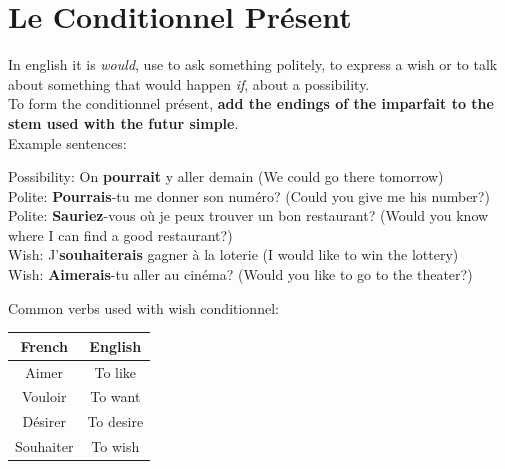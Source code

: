 \documentclass{book}
\begin{document}
\section{Le Conditionnel Présent}
In english it is \textit{would}, use to ask something politely, to express a wish or to talk about something that would happen \textit{if}, about a possibility. \\
To form the conditionnel présent, \textbf{add the endings of the imparfait to the stem used with the futur simple}. \\
Example sentences:
\begin{center}
    Possibility: On \textbf{pourrait} y aller demain (We could go there tomorrow) \\
    Polite: \textbf{Pourrais}-tu me donner son numéro? (Could you give me his number?) \\
    Polite: \textbf{Sauriez}-vous où je peux trouver un bon restaurant? (Would you know where I can find a good restaurant?) \\
    Wish: J'\textbf{souhaiterais} gagner à la loterie (I would like to win the lottery) \\
    Wish: \textbf{Aimerais}-tu aller au cinéma? (Would you like to go to the theater?)
\end{center}
Common verbs used with wish conditionnel:
\begin{center}
    \begin{tabular}{|c|c|}
        \hline
        \textbf{French} & \textbf{English} \\
        \hline
        Aimer & To like \\
        \hline
        Vouloir & To want \\
        \hline
        Désirer & To desire \\
        \hline
        Souhaiter & To wish \\
        \hline
    \end{tabular}
\end{center}
\end{document}
